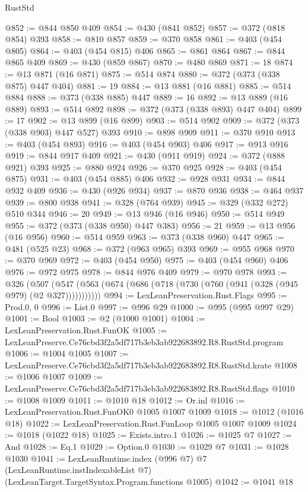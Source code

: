 \begin{lexlean}{RustStd}
\begin{coremodule}
@852 := @844 @850 @409
@854 := @430 (@841 @852)
@857 := @372 (@818 @854) @393
@858 := @810 @857
@859 := @370 @858
@861 := @403 (@454 @805)
@864 := @403 (@454 @815) @406
@865 := @861 @864
@867 := @844 @865 @409
@869 := @430 (@859 @867)
@870 := @480 @869
@871 := 18
@874 := @13 @871 (@16 @871)
@875 := @514 @874
@880 := @372 (@373 (@338 @875) @447 @404)
@881 := 19
@884 := @13 @881 (@16 @881)
@885 := @514 @884
@888 := @373 (@338 @885) @447
@889 := 16
@892 := @13 @889 (@16 @889)
@893 := @514 @892
@898 := @372 (@373 (@338 @893) @447 @404)
@899 := 17
@902 := @13 @899 (@16 @899)
@903 := @514 @902
@909 := @372 (@373 (@338 @903) @447 @527) @393
@910 := @898 @909
@911 := @370 @910
@913 := @403 (@454 @893)
@916 := @403 (@454 @903) @406
@917 := @913 @916
@919 := @844 @917 @409
@921 := @430 (@911 @919)
@924 := @372 (@888 @921) @393
@925 := @880 @924
@926 := @370 @925
@928 := @403 (@454 @875)
@931 := @403 (@454 @885) @406
@932 := @928 @931
@934 := @844 @932 @409
@936 := @430 (@926 @934)
@937 := @870 @936
@938 := @464 @937
@939 := @800 @938
@941 := @328 (@764 @939)
@945 := @329 (@332 @272) @510 @344
@946 := 20
@949 := @13 @946 (@16 @946)
@950 := @514 @949
@955 := @372 (@373 (@338 @950) @447 @383)
@956 := 21
@959 := @13 @956 (@16 @956)
@960 := @514 @959
@963 := @373 (@338 @960) @447
@965 := @481 (@525 @23)
@968 := @372 (@963 @965) @393
@969 := @955 @968
@970 := @370 @969
@972 := @403 (@454 @950)
@975 := @403 (@454 @960) @406
@976 := @972 @975
@978 := @844 @976 @409
@979 := @970 @978
@993 := @326
    (@507 (@547 (@563 (@674 (@686 (@718 (@730 (@760 (@941 (@328 (@945 @979) (@2 @327)))))))))))
@994 := LexLeanPreservation.Rust.Flags
@995 := Prod.{0, 0}
@996 := List.{0}
@997 := @996 @29
@1000 := @995 (@995 @997 @29)
@1001 := Bool
@1003 := @2 (@1000 @1001)
@1004 := LexLeanPreservation.Rust.FunOK
@1005 := LexLeanPreserve.Ce76cbd3f2a5df717b3eb3ab922683892.R8.RustStd.program
@1006 := @1004 @1005
@1007 := LexLeanPreserve.Ce76cbd3f2a5df717b3eb3ab922683892.R8.RustStd.krate
@1008 := @1006 @1007
@1009 := LexLeanPreserve.Ce76cbd3f2a5df717b3eb3ab922683892.R8.RustStd.flags
@1010 := @1008 @1009
@1011 := @1010 @18
@1012 := Or.inl
@1016 := LexLeanPreservation.Rust.FunOK0 @1005 @1007 @1009
@1018 := @1012 (@1016 @18)
@1022 := LexLeanPreservation.Rust.FunLoop @1005 @1007 @1009
@1024 := @1018 (@1022 @18)
@1025 := Exists.intro.{1}
@1026 := @1025 @7
@1027 := And
@1028 := Eq.{1}
@1029 := Option.{0}
@1030 := @1029 @7
@1031 := @1028 @1030
@1041 := LexLeanRuntime.index
    (@996 @7)
    @7
    (LexLeanRuntime.instIndexableList @7)
    (LexLeanTarget.TargetSyntax.Program.functions @1005)
@1042 := @1041 @18

\end{coremodule}
\end{lexlean}
